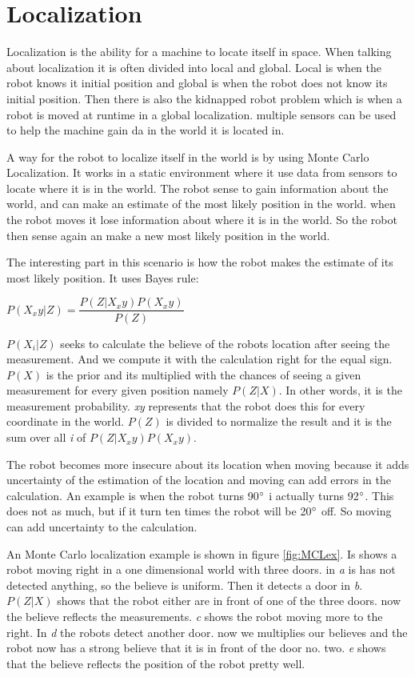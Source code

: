 \chapter{Localization}
\label{chp:local}

Localization is the ability for a machine to locate itself in space. When talking about localization it is often divided into local and global. Local is when the robot knows it initial position and global is when the robot does not know its initial position. Then there is also the kidnapped robot problem which is when a robot is moved at runtime in a global localization. multiple sensors can be used to help the machine gain da in the world it is located in.
 
A way for the robot to localize itself in the world is by using Monte Carlo Localization. 
It works in a static environment where it use data from sensors to locate where it is in the world.
The robot sense to gain information about the world, and can make an estimate of the most likely position in the world. when the robot moves it lose information about where it is in the world. So the robot then sense again an make a new most likely position in the world.

The interesting part in this scenario is how the robot makes the estimate of its most likely position. 
It uses Bayes rule:

\begin{center}
	$P(X_xy|Z) = \dfrac{P(Z|X_xy) P(X_xy)}{P(Z)}$
\end{center}

$P(X_i|Z)$ seeks to calculate the believe of the robots location after seeing the measurement. And we compute it with the calculation right for the equal sign. 
$P(X)$ is the prior and its multiplied with the chances of seeing a given measurement for every given position namely $P(Z|X)$. In other words, it is the measurement probability. \emph{xy} represents that the robot does this for every coordinate in the world. $P(Z)$ is divided to normalize the result and it is the sum over all \emph{i} of $P(Z|X_xy) P(X_xy)$.

The robot becomes more insecure about its location when moving because it adds uncertainty of the estimation of the location and moving can add errors in the calculation. An example is when the robot turns 90$^\circ$ i actually turns 92$^\circ$. This does not as much, but if it turn ten times the robot will be 20$^\circ$ off. So moving can add uncertainty to the calculation. 

An Monte Carlo localization example is shown in figure \ref{fig:MCLex}. Is shows a robot moving right in a one dimensional world with three doors. in \emph{a} is has not detected anything, so the believe is uniform. Then it detects a door in \emph{b}. $P(Z|X)$ shows that the robot either are in front of one of the three doors. now the believe reflects the measurements. 
\emph{c} shows the robot moving more to the right. In \emph{d} the robots detect another door. now we multiplies our believes and the robot now has a strong believe that it is in front of the door no. two. 
\emph{e} shows that the believe reflects the position of the robot pretty well. 

